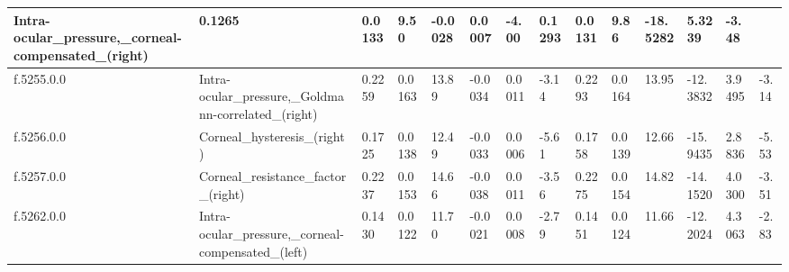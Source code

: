 \begin{longtable}{llllllllllllll}
  \multicolumn{1}{l|}{Intra-ocular\_pressure,\_corneal-compensated\_(right)} &
  \multicolumn{1}{l|}{0.1265} &
  \multicolumn{1}{l|}{0.0133} &
  \multicolumn{1}{l|}{9.50} &
  \multicolumn{1}{l|}{-0.0028} &
  \multicolumn{1}{l|}{0.0007} &
  \multicolumn{1}{l|}{-4.00} &
  \multicolumn{1}{l|}{0.1293} &
  \multicolumn{1}{l|}{0.0131} &
  \multicolumn{1}{l|}{9.86} &
  \multicolumn{1}{l|}{-18.5282} &
  \multicolumn{1}{l|}{5.3239} &
  \multicolumn{1}{l|}{-3.48} \\ \hline
\multicolumn{1}{|l|}{f.5255.0.0} &
  \multicolumn{1}{l|}{Intra-ocular\_pressure,\_Goldmann-correlated\_(right)} &
  \multicolumn{1}{l|}{0.2259} &
  \multicolumn{1}{l|}{0.0163} &
  \multicolumn{1}{l|}{13.89} &
  \multicolumn{1}{l|}{-0.0034} &
  \multicolumn{1}{l|}{0.0011} &
  \multicolumn{1}{l|}{-3.14} &
  \multicolumn{1}{l|}{0.2293} &
  \multicolumn{1}{l|}{0.0164} &
  \multicolumn{1}{l|}{13.95} &
  \multicolumn{1}{l|}{-12.3832} &
  \multicolumn{1}{l|}{3.9495} &
  \multicolumn{1}{l|}{-3.14} \\ \hline
\multicolumn{1}{|l|}{f.5256.0.0} &
  \multicolumn{1}{l|}{Corneal\_hysteresis\_(right)} &
  \multicolumn{1}{l|}{0.1725} &
  \multicolumn{1}{l|}{0.0138} &
  \multicolumn{1}{l|}{12.49} &
  \multicolumn{1}{l|}{-0.0033} &
  \multicolumn{1}{l|}{0.0006} &
  \multicolumn{1}{l|}{-5.61} &
  \multicolumn{1}{l|}{0.1758} &
  \multicolumn{1}{l|}{0.0139} &
  \multicolumn{1}{l|}{12.66} &
  \multicolumn{1}{l|}{-15.9435} &
  \multicolumn{1}{l|}{2.8836} &
  \multicolumn{1}{l|}{-5.53} \\ \hline
\multicolumn{1}{|l|}{f.5257.0.0} &
  \multicolumn{1}{l|}{Corneal\_resistance\_factor\_(right)} &
  \multicolumn{1}{l|}{0.2237} &
  \multicolumn{1}{l|}{0.0153} &
  \multicolumn{1}{l|}{14.66} &
  \multicolumn{1}{l|}{-0.0038} &
  \multicolumn{1}{l|}{0.0011} &
  \multicolumn{1}{l|}{-3.56} &
  \multicolumn{1}{l|}{0.2275} &
  \multicolumn{1}{l|}{0.0154} &
  \multicolumn{1}{l|}{14.82} &
  \multicolumn{1}{l|}{-14.1520} &
  \multicolumn{1}{l|}{4.0300} &
  \multicolumn{1}{l|}{-3.51} \\ \hline
\multicolumn{1}{|l|}{f.5262.0.0} &
  \multicolumn{1}{l|}{Intra-ocular\_pressure,\_corneal-compensated\_(left)} &
  \multicolumn{1}{l|}{0.1430} &
  \multicolumn{1}{l|}{0.0122} &
  \multicolumn{1}{l|}{11.70} &
  \multicolumn{1}{l|}{-0.0021} &
  \multicolumn{1}{l|}{0.0008} &
  \multicolumn{1}{l|}{-2.79} &
  \multicolumn{1}{l|}{0.1451} &
  \multicolumn{1}{l|}{0.0124} &
  \multicolumn{1}{l|}{11.66} &
  \multicolumn{1}{l|}{-12.2024} &
  \multicolumn{1}{l|}{4.3063} &
  \multicolumn{1}{l|}{-2.83} \\ \hline

\end{longtable}
